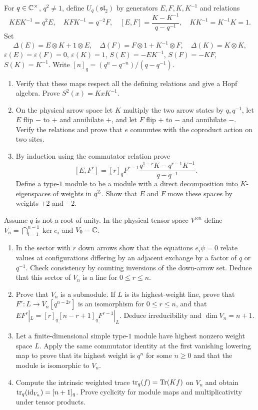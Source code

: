 \begin{exercise}
For $q\in\mathbb C^\times$, $q^2\ne1$, define $U_q(\mathfrak{sl}_2)$
by generators $E,F,K,K^{-1}$ and relations
\[
 KEK^{-1}=q^2E,\quad KFK^{-1}=q^{-2}F,\quad
 [E,F]=\frac{K-K^{-1}}{q-q^{-1}},\quad KK^{-1}=K^{-1}K=1.
\]
Set
\[
 \Delta(E)=E\otimes K+1\otimes E,\quad
 \Delta(F)=F\otimes1+K^{-1}\otimes F,\quad
 \Delta(K)=K\otimes K,
\]
$\varepsilon(E)=\varepsilon(F)=0$, $\varepsilon(K)=1$,
$S(E)=-EK^{-1}$, $S(F)=-KF$, $S(K)=K^{-1}$.
Write $[n]_q=(q^n-q^{-n})/(q-q^{-1})$.
\begin{enumerate}[label=(\alph*)]
\item Verify that these maps respect all the defining relations
and give a Hopf algebra. Prove $S^2(x)=KxK^{-1}$.
\item On the physical arrow space let $K$ multiply the two
arrow states by $q,q^{-1}$, let $E$ flip $-$ to $+$ and
annihilate $+$, and let $F$ flip $+$ to $-$ and annihilate $-$.
Verify the relations and prove that $e$ commutes with the
coproduct action on two sites.
\item By induction using the commutator relation prove
\[
 [E,F^r]=[r]_q F^{r-1}
 \frac{q^{1-r}K-q^{r-1}K^{-1}}{q-q^{-1}}.
\]
Define a type-$1$ module to be a module with a direct
decomposition into $K$-eigenspaces of weights in $q^\mathbb Z$.
Show that $E$ and $F$ move these spaces by weights $+2$ and $-2$.
\end{enumerate}
\end{exercise}

\begin{exercise}
Assume $q$ is not a root of unity. In the physical tensor space
$V^{\otimes n}$ define $V_n=\bigcap_{i=1}^{n-1}\ker e_i$ and
$V_0=\mathbb C$.
\begin{enumerate}[label=(\alph*)]
\item In the sector with $r$ down arrows show that the equations
$e_i\psi=0$ relate values at configurations differing by an
adjacent exchange by a factor of $q$ or $q^{-1}$.
Check consistency by counting inversions of the down-arrow set.
Deduce that this sector of $V_n$ is a line for $0\le r\le n$.
\item Prove that $V_n$ is a submodule. If $L$ is its
highest-weight line, prove that $F^r:L\to V_n[q^{n-2r}]$
is an isomorphism for $0\le r\le n$, and that
$EF^r|_L=[r]_q[n-r+1]_qF^{r-1}|_L$.
Deduce irreducibility and $\dim V_n=n+1$.
\item Let a finite-dimensional simple type-$1$ module have
highest nonzero weight space $L$. Apply the same commutator
identity at the first vanishing lowering map to prove that its
highest weight is $q^n$ for some $n\ge0$ and that the module
is isomorphic to $V_n$.
\item Compute the intrinsic weighted trace
$\operatorname{tr}_q(f)=\operatorname{Tr}(Kf)$ on $V_n$ and obtain
$\operatorname{tr}_q(\operatorname{id}_{V_n})=[n+1]_q$.
Prove cyclicity for module maps and multiplicativity under
tensor products.
\end{enumerate}
\end{exercise}


